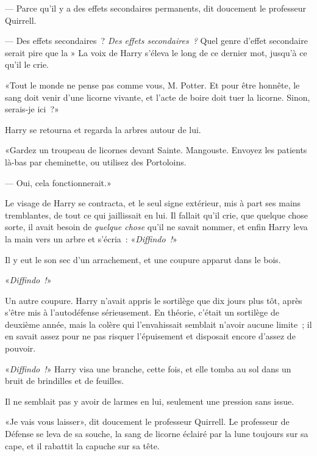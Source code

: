 --- Parce qu'il y a des effets secondaires permanents, dit doucement le professeur Quirrell.

--- Des effets secondaires~? \emph{Des effets secondaires~?} Quel genre d'effet secondaire serait pire que la » La voix de Harry s'éleva le long de ce dernier mot, jusqu'à ce qu'il le crie.

«Tout le monde ne pense pas comme vous, M. Potter. Et pour être honnête, le sang doit venir d'une licorne vivante, et l'acte de boire doit tuer la licorne. Sinon, serais-je ici~?»

Harry se retourna et regarda la arbres autour de lui.

«Gardez un troupeau de licornes devant Sainte. Mangouste. Envoyez les patients là-bas par cheminette, ou utilisez des Portoloins.

--- Oui, cela fonctionnerait.»

Le visage de Harry se contracta, et le seul signe extérieur, mis à part ses mains tremblantes, de tout ce qui jaillissait en lui. Il fallait qu'il crie, que quelque chose sorte, il avait besoin de \emph{quelque chose} qu'il ne savait nommer, et enfin Harry leva la main vers un arbre et s'écria~: «\emph{Diffindo~!}»

Il y eut le son sec d'un arrachement, et une coupure apparut dans le bois.

«\emph{Diffindo~!}»

Un autre coupure. Harry n'avait appris le sortilège que dix jours plus tôt, après s'être mis à l'autodéfense sérieusement. En théorie, c'était un sortilège de deuxième année, mais la colère qui l'envahissait semblait n'avoir aucune limite~; il en savait assez pour ne pas risquer l'épuisement et disposait encore d'assez de pouvoir.

«\emph{Diffindo~!}» Harry visa une branche, cette fois, et elle tomba au sol dans un bruit de brindilles et de feuilles.

Il ne semblait pas y avoir de larmes en lui, seulement une pression sans issue.

«Je vais vous laisser», dit doucement le professeur Quirrell. Le professeur de Défense se leva de sa souche, la sang de licorne éclairé par la lune toujours sur sa cape, et il rabattit la capuche sur sa tête. 

